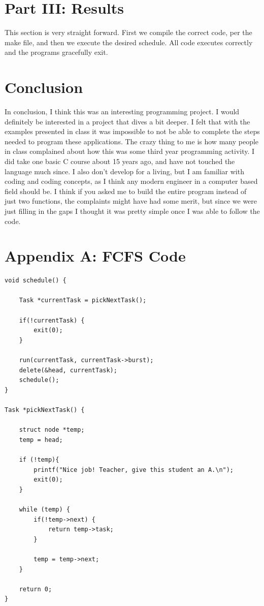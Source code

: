 \documentclass[10pt]{article}
\begin{document}
\section{Part III: Results}
This section is very straight forward.  First we compile the correct code, per the make file, and then we execute the desired schedule.  All code executes correctly and the programs gracefully exit.


\section{Conclusion}
In conclusion, I think this was an interesting programming project.  I would definitely be interested in a project that dives a bit deeper.  I felt that with the examples presented in class it was impossible to not be able to complete the steps needed to program these applications.  The crazy thing to me is how many people in class complained about how this was some third year programming activity.  I did take one basic C course about 15 years ago, and have not touched the language much since.  I also don't develop for a living, but I am familiar with coding and coding concepts, as I think any modern engineer in a computer based field should be.  I think if you asked me to build the entire program instead of just two functions, the complaints might have had some merit, but since we were just filling in the gaps I thought it was pretty simple once I was able to follow the code.

\pagebreak
\section{Appendix A: FCFS Code}
\begin{verbatim}
void schedule() {

    Task *currentTask = pickNextTask();

    if(!currentTask) {
        exit(0);
    }

    run(currentTask, currentTask->burst);
    delete(&head, currentTask);
    schedule();
}

Task *pickNextTask() {

    struct node *temp;
    temp = head;

    if (!temp){
        printf("Nice job! Teacher, give this student an A.\n");
        exit(0);
    }
    
    while (temp) {
        if(!temp->next) {
            return temp->task;
        }

        temp = temp->next;
    }

    return 0;
}
\end{verbatim}
\end{document}
